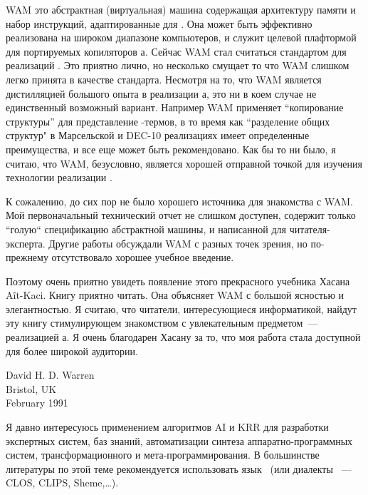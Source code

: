 WAM это абстрактная (виртуальная) машина содержащая архитектуру памяти и набор
инструкций, адаптированные для . Она может быть эффективно реализована
на широком диапазоне компьютеров, и служит целевой плафтормой для портируемых
копиляторов \prolog а. Сейчас WAM стал считаться стандартом для реализаций
\prolog. Это приятно лично, но несколько смущает то что WAM слишком легко
принята в качестве стандарта. Несмотря на то, что WAM является дистилляцией
большого опыта в реализации \prolog а, это ни в коем случае не единственный
возможный вариант. Например WAM применяет ``копирование структуры'' для
представление \prolog-термов, в то время как ``разделение общих
структур" в Марсельской и DEC-10 реализациях имеет определенные преимущества,
и все еще может быть рекомендовано. Как бы то ни было, я считаю, что WAM,
безусловно, является хорошей отправной точкой для изучения технологии
реализации \prolog.

К сожалению, до сих пор не было хорошего источника для знакомства с WAM. Мой
первоначальный технический отчет не слишком доступен, содержит только ``голую``
спецификацию абстрактной машины, и написанной для читателя-эксперта. Другие
работы обсуждали WAM с разных точек зрения, но по-прежнему отсутствовало хорошее
учебное введение.

Поэтому очень приятно увидеть появление этого прекрасного учебника Хасана
A\^it-Kaci. Книгу приятно читать. Она объясняет WAM с большой ясностью и
элегантностью. Я считаю, что читатели, интересующиеся информатикой, найдут эту
книгу стимулирующем знакомством с увлекательным предметом\ --- реализацией
\prolog а. Я очень благодарен Хасану за то, что моя работа стала доступной для
более широкой аудитории.

\bigskip
\begin{flushright}
David H. D. Warren\\
Bristol, UK\\
February 1991
\end{flushright}
\clearpage


\clearpage
{}

Я давно интересуюсь применением алгоритмов AI и
KRR для разработки экспертных систем, баз знаний,
автоматизации синтеза аппаратно-програм\-мных систем\cite{bibilo},
трансформационного и
мета-программирования. В большинстве литературы по этой теме рекомендуется
использовать язык \prolog\ (или диалекты \lisp\ --- CLOS, CLIPS,
Sheme,\ldots).

